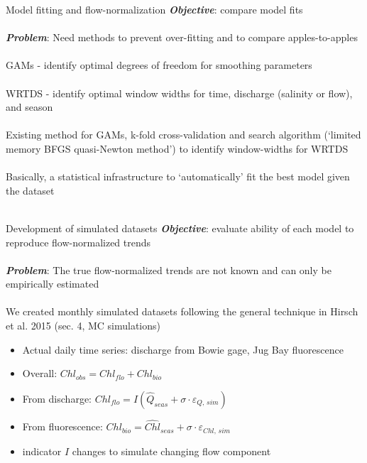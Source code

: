 \documentclass[serif]{beamer}\usepackage[]{graphicx}\usepackage[]{color}
\newcommand{\Bigtxt}[1]{\textbf{\textit{#1}}}
\begin{document}
\begin{frame}{Model fitting and flow-normalization}
\Bigtxt{Objective}: compare model fits \\~\\
\Bigtxt{Problem}: Need methods to prevent over-fitting and to compare apples-to-apples\\~\\
GAMs - identify optimal degrees of freedom for smoothing parameters \\~\\
WRTDS - identify optimal window widths for time, discharge (salinity or flow), and season \\~\\
Existing method for GAMs, k-fold cross-validation and search algorithm (`limited memory BFGS quasi-Newton method') to identify window-widths for WRTDS \\~\\
Basically, a statistical infrastructure to `automatically' fit the best model given the dataset \\~\\
\end{frame}

\begin{frame}{Development of simulated datasets}
\Bigtxt{Objective}: evaluate ability of each model to reproduce flow-normalized trends\\~\\
\Bigtxt{Problem}: The true flow-normalized trends are not known and can only be empirically estimated \\~\\
We created monthly simulated datasets following the general technique in Hirsch et al. 2015 (sec. 4, MC simulations) \\
\begin{itemize}
\item Actual daily time series: discharge from Bowie gage, Jug Bay fluorescence
\item Overall: $Chl_{obs} = Chl_{flo} + Chl_{bio}$
\item From discharge: $Chl_{flo} = I\left(\widehat{Q}_{seas} + \sigma\cdot\varepsilon_{Q,\,sim}\right)$
\item From fluorescence: $Chl_{bio} = \widehat{Chl}_{seas} + \sigma\cdot\varepsilon_{Chl,\,sim}$
\item indicator $I$ changes to simulate changing flow component
\end{itemize}
\end{frame}
\end{document}
